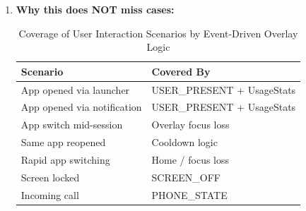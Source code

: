 \documentclass[12pt]{article}
\begin{document}
\begin{enumerate}
\begin{enumerate}
\begin{enumerate}
     \item ↓
     \item KEYGUARD\_LOCKED
    \item ↓
    \item Lock overlay
     \item ↓
    \item  USER\_PRESENT
    \item  ↓
    \item Delayed foreground check
     \item ↓
    \item Overlay shown
     \item ↓
    \item Overlay loses focus OR Home OR Call OR Screen off
    \item  ↓
    \item Overlay removed
     \item ↓
    \item Next app entry → repeat
    \end{enumerate}
    \item \textbf{Why this does NOT miss cases: }
    \begin{table}[h]
    \centering
    \caption{Coverage of User Interaction Scenarios by Event-Driven Overlay Logic}
    \label{tab:overlay-coverage}
    \begin{tabular}{|l|l|}
    \hline
    \textbf{Scenario} & \textbf{Covered By} \\ \hline
    App opened via launcher & USER\_PRESENT + UsageStats \\ \hline
    App opened via notification & USER\_PRESENT + UsageStats \\ \hline
    App switch mid-session & Overlay focus loss \\ \hline
    Same app reopened & Cooldown logic \\ \hline
    Rapid app switching & Home / focus loss \\ \hline
    Screen locked & SCREEN\_OFF \\ \hline
    Incoming call & PHONE\_STATE \\ \hline
    \end{tabular}
    \end{table}
    

\end{enumerate}
\end{enumerate}
\end{document}
